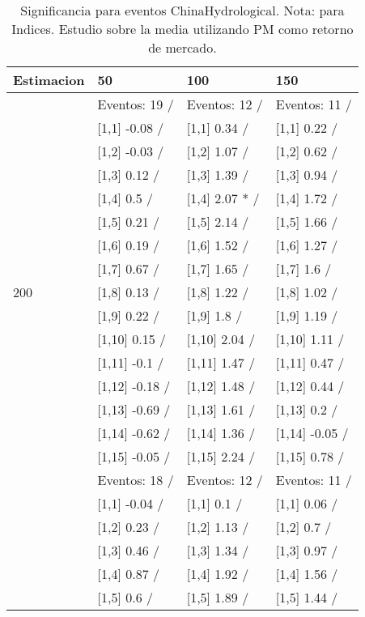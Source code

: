 \begin{table}

\caption{Significancia para eventos ChinaHydrological. Nota: para Indices. Estudio sobre la media utilizando PM como retorno de mercado.}
\centering
\begin{tabular}[t]{llll}
\toprule
Estimacion & 50 & 100 & 150\\
\midrule
 & Eventos:  19 / & Eventos:  12 / & Eventos:  11 /\\
 & {}[1,1] -0.08  / & {}[1,1] 0.34  / & {}[1,1] 0.22  /\\
 & {}[1,2] -0.03  / & {}[1,2] 1.07  / & {}[1,2] 0.62  /\\
 & {}[1,3] 0.12  / & {}[1,3] 1.39  / & {}[1,3] 0.94  /\\
 & {}[1,4] 0.5  / & {}[1,4] 2.07 * / & {}[1,4] 1.72  /\\
\addlinespace
 & {}[1,5] 0.21  / & {}[1,5] 2.14  / & {}[1,5] 1.66  /\\
 & {}[1,6] 0.19  / & {}[1,6] 1.52  / & {}[1,6] 1.27  /\\
 & {}[1,7] 0.67  / & {}[1,7] 1.65  / & {}[1,7] 1.6  /\\
200 & {}[1,8] 0.13  / & {}[1,8] 1.22  / & {}[1,8] 1.02  /\\
 & {}[1,9] 0.22  / & {}[1,9] 1.8  / & {}[1,9] 1.19  /\\
\addlinespace
 & {}[1,10] 0.15  / & {}[1,10] 2.04  / & {}[1,10] 1.11  /\\
 & {}[1,11] -0.1  / & {}[1,11] 1.47  / & {}[1,11] 0.47  /\\
 & {}[1,12] -0.18  / & {}[1,12] 1.48  / & {}[1,12] 0.44  /\\
 & {}[1,13] -0.69  / & {}[1,13] 1.61  / & {}[1,13] 0.2  /\\
 & {}[1,14] -0.62  / & {}[1,14] 1.36  / & {}[1,14] -0.05  /\\
\addlinespace
 & {}[1,15] -0.05  / & {}[1,15] 2.24  / & {}[1,15] 0.78  /\\
 & Eventos:  18 / & Eventos:  12 / & Eventos:  11 /\\
 & {}[1,1] -0.04  / & {}[1,1] 0.1  / & {}[1,1] 0.06  /\\
 & {}[1,2] 0.23  / & {}[1,2] 1.13  / & {}[1,2] 0.7  /\\
 & {}[1,3] 0.46  / & {}[1,3] 1.34  / & {}[1,3] 0.97  /\\
\addlinespace
 & {}[1,4] 0.87  / & {}[1,4] 1.92  / & {}[1,4] 1.56  /\\
 & {}[1,5] 0.6  / & {}[1,5] 1.89  / & {}[1,5] 1.44  /\\

\end{tabular}
\end{table}
